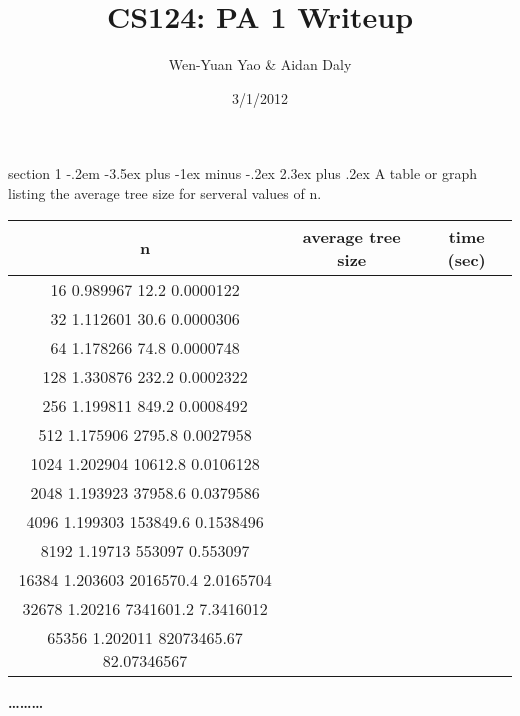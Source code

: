 \documentclass[12pt]{article}
\makeatletter
\newenvironment{problem}{\@startsection
       {section}
       {1}
       {-.2em}
       {-3.5ex plus -1ex minus -.2ex}
       {2.3ex plus .2ex}
       {\pagebreak[3]%
       \large\bf\noindent{Problem }
       }
       }
       {%
       \begin{center}\large\bf \ldots\ldots\ldots\end{center}}
\makeatother
\begin{document}
\title{CS124: PA 1 Writeup}
\author{Wen-Yuan Yao & Aidan Daly}
\date{3/1/2012}
\thispagestyle{empty}

\begin{problem}{}
A table or graph listing the average tree size for serveral values of n.

\begin{tabular}{ | c | c | c | }
  \hline                        
  n & average tree size & time (sec) \\
  \hline
  16	0.989967	12.2	0.0000122 \\
  32	1.112601	30.6	0.0000306 \\
  64	1.178266	74.8	0.0000748 \\
  128	1.330876	232.2	0.0002322 \\
  256	1.199811	849.2	0.0008492 \\
  512	1.175906	2795.8	0.0027958 \\
  1024	1.202904	10612.8	0.0106128 \\
  2048	1.193923	37958.6	0.0379586 \\
  4096	1.199303	153849.6	0.1538496 \\
  8192	1.19713	553097	0.553097 \\
  16384	1.203603	2016570.4	2.0165704 \\
  32678	1.20216	7341601.2	7.3416012 \\
  65356	1.202011	82073465.67	82.07346567 \\
  \hline  
\end{tabular}

\end{problem}
\end{document}
